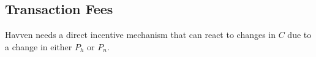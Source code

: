 









\newpage
\subsection{Transaction Fees} Havven needs a direct incentive mechanism that can react to changes in $C$ due to a change in either $P_h$ or $P_n$.

